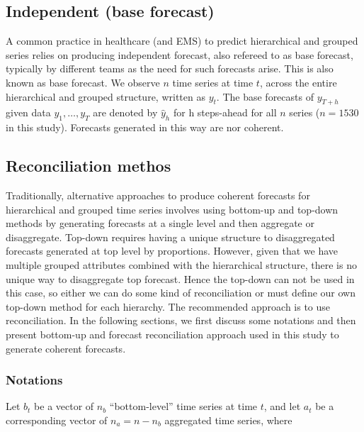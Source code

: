 \documentclass[
  authoryear,
  preprint,
  3p]{elsarticle}
\begin{document}
\hypertarget{independent-base-forecast}{%
\subsection{Independent (base
forecast)}\label{independent-base-forecast}}

A common practice in healthcare (and EMS) to predict hierarchical and
grouped series relies on producing independent forecast, also refereed
to as base forecast, typically by different teams as the need for such
forecasts arise. This is also known as base forecast. We observe \(n\)
time series at time \(t\), across the entire hierarchical and grouped
structure, written as \(y_t\). The base forecasts of \(y_{T+h}\) given
data \(y_1,\dots,y_T\) are denoted by \(\hat{y}_h\) for h steps-ahead
for all \(n\) series (\(n=1530\) in this study). Forecasts generated in
this way are nor coherent.

\hypertarget{reconciliation-methos}{%
\subsection{Reconciliation methos}\label{reconciliation-methos}}

Traditionally, alternative approaches to produce coherent forecasts for
hierarchical and grouped time series involves using bottom-up and
top-down methods by generating forecasts at a single level and then
aggregate or disaggregate. Top-down requires having a unique structure
to disaggregated forecasts generated at top level by proportions.
However, given that we have multiple grouped attributes combined with
the hierarchical structure, there is no unique way to disaggregate top
forecast. Hence the top-down can not be used in this case, so either we
can do some kind of reconciliation or must define our own top-down
method for each hierarchy. The recommended approach is to use
reconciliation. In the following sections, we first discuss some
notations and then present bottom-up and forecast reconciliation
approach used in this study to generate coherent forecasts.

\hypertarget{notations}{%
\subsubsection{Notations}\label{notations}}

Let \(b_t\) be a vector of \(n_b\) ``bottom-level'' time series at time
\(t\), and let \(a_t\) be a corresponding vector of \(n_a = n-n_b\)
aggregated time series, where
\end{document}

